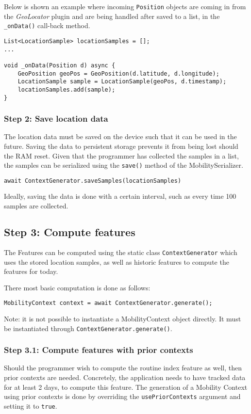 Below is shown an example where incoming \verb|Position| objects are coming in from the \textit{GeoLocator} plugin and are being handled after saved to a list, in the \verb|_onData()| call-back method.

\begin{verbatim}
List<LocationSample> locationSamples = [];
...

void _onData(Position d) async {
    GeoPosition geoPos = GeoPosition(d.latitude, d.longitude);
    LocationSample sample = LocationSample(geoPos, d.timestamp);
    locationSamples.add(sample);
}
\end{verbatim}

\subsubsection*{Step 2: Save location data}
The location data must be saved on the device such that it can be used in the future. Saving the data to persistent storage prevents it from being lost should the RAM reset. Given that the programmer has collected the samples in a list, the samples can be serialized using the \verb|save()| method of the MobilitySerializer.

\begin{verbatim}
await ContextGenerator.saveSamples(locationSamples)
\end{verbatim}

Ideally, saving the data is done with a certain interval, such as every time 100 samples are collected. 

\subsection*{Step 3: Compute features}
The Features can be computed using the static class \verb|ContextGenerator| which uses the stored location samples, as well as historic features to compute the features for today.

There most basic computation is done as follows:
\begin{verbatim}
MobilityContext context = await ContextGenerator.generate();
\end{verbatim}

Note: it is not possible to instantiate a MobilityContext object directly. 
It must be instantiated through \verb|ContextGenerator.generate()|.

\subsubsection*{Step 3.1: Compute features with prior contexts}
Should the programmer wish to compute the routine index feature as well, then prior contexts are needed. Concretely, the application needs to have tracked data for at least 2 days, to compute this feature. The generation of a Mobility Context using prior contexts is done by overriding the \verb|usePriorContexts| argument and setting it to \verb|true|.

